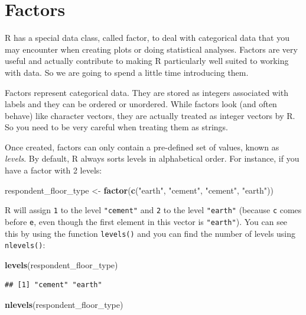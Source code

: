 \documentclass[]{book}
\newenvironment{Shaded}{\begin{snugshade}}{\end{snugshade}}
\newcommand{\KeywordTok}[1]{\textcolor[rgb]{0.13,0.29,0.53}{\textbf{#1}}}
\newcommand{\StringTok}[1]{\textcolor[rgb]{0.31,0.60,0.02}{#1}}
\newcommand{\NormalTok}[1]{#1}
\begin{document}
\section{Factors}\label{factors}

R has a special data class, called factor, to deal with categorical data
that you may encounter when creating plots or doing statistical
analyses. Factors are very useful and actually contribute to making R
particularly well suited to working with data. So we are going to spend
a little time introducing them.

Factors represent categorical data. They are stored as integers
associated with labels and they can be ordered or unordered. While
factors look (and often behave) like character vectors, they are
actually treated as integer vectors by R. So you need to be very careful
when treating them as strings.

Once created, factors can only contain a pre-defined set of values,
known as \emph{levels}. By default, R always sorts levels in
alphabetical order. For instance, if you have a factor with 2 levels:

\begin{Shaded}
\begin{Highlighting}[]
\NormalTok{respondent_floor_type <-}\StringTok{ }\KeywordTok{factor}\NormalTok{(}\KeywordTok{c}\NormalTok{(}\StringTok{"earth"}\NormalTok{, }\StringTok{"cement"}\NormalTok{, }\StringTok{"cement"}\NormalTok{, }\StringTok{"earth"}\NormalTok{))}
\end{Highlighting}
\end{Shaded}

R will assign \texttt{1} to the level \texttt{"cement"} and \texttt{2}
to the level \texttt{"earth"} (because \texttt{c} comes before
\texttt{e}, even though the first element in this vector is
\texttt{"earth"}). You can see this by using the function
\texttt{levels()} and you can find the number of levels using
\texttt{nlevels()}:

\begin{Shaded}
\begin{Highlighting}[]
\KeywordTok{levels}\NormalTok{(respondent_floor_type)}
\end{Highlighting}
\end{Shaded}

\begin{verbatim}
## [1] "cement" "earth"
\end{verbatim}

\begin{Shaded}
\begin{Highlighting}[]
\KeywordTok{nlevels}\NormalTok{(respondent_floor_type)}
\end{Highlighting}
\end{Shaded}
\end{document}
